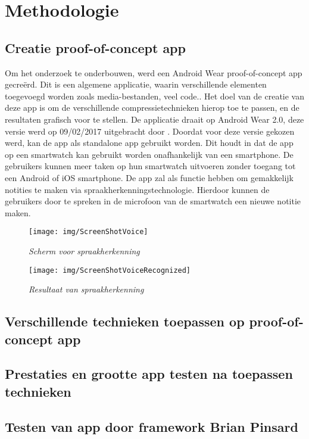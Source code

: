 
\chapter{Methodologie}
\label{ch:methodologie}


\section{Creatie proof-of-concept app}
\label{sec:proofofconcept}

Om het onderzoek te onderbouwen, werd een Android Wear proof-of-concept app gecreërd. Dit is een algemene applicatie, waarin verschillende elementen toegevoegd worden zoals media-bestanden, veel code.. Het doel van de creatie van deze app is om de verschillende compressietechnieken hierop toe te passen, en de resultaten grafisch voor te stellen. De applicatie draait op Android Wear 2.0, deze versie werd op 09/02/2017 uitgebracht door \textcite{Google} . Doordat voor deze versie gekozen werd, kan de app als standalone app gebruikt worden. Dit houdt in dat de app op een smartwatch kan gebruikt worden onafhankelijk van een smartphone. De gebruikers kunnen meer taken op hun smartwatch uitvoeren zonder toegang tot een Android of iOS smartphone. De app zal als functie hebben om gemakkelijk notities te maken via spraakherkenningstechnologie. Hierdoor kunnen de gebruikers door te spreken in de microfoon van de smartwatch een nieuwe notitie maken. 
\begin{figure}[h]
	\caption{\textit{Scherm voor spraakherkenning}}
	\texttt{[image: img/ScreenShotVoice]}\\[.5cm]
	\centering
\end{figure}
\begin{figure}[h]
	\caption{\textit{Resultaat van spraakherkenning}}
	\texttt{[image: img/ScreenShotVoiceRecognized]}\\[.5cm]
	\centering
\end{figure}
\section{Verschillende technieken toepassen op proof-of-concept app}
\label{sec:techniekentoepassen}


\section{Prestaties en grootte app testen na toepassen technieken}
\label{sec:prestatiesgrootteapp}

\section{Testen van app door framework Brian Pinsard}
\label{sec:apptesting}